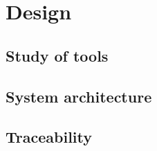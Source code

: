 \chapter{Design}\label{chap:design}

\section{Study of tools}\label{sec:study}








\section{System architecture}\label{sec:architecture}






\section{Traceability}\label{sec:comp-traceability}
